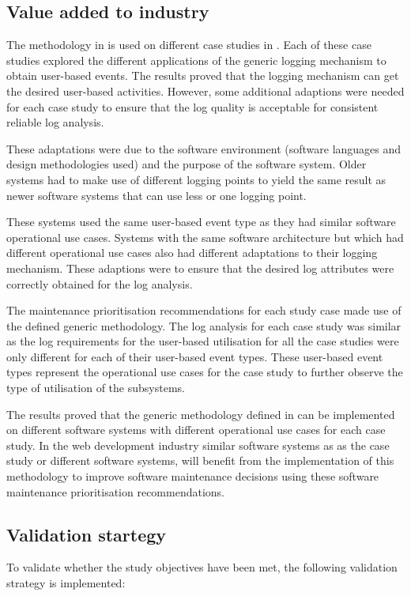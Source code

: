\subsection{Value added to industry}
The methodology in  is used on different case studies in .
Each of these case studies explored the different applications of the generic logging mechanism to
obtain user-based events. The results proved that the logging mechanism can get the desired
user-based activities. However, some additional adaptions were needed for each case study to ensure
that the log quality is acceptable for consistent reliable log analysis.\par These adaptations were
due to the software environment (software languages and design methodologies used) and the purpose
of the software system. Older systems had to make use of different logging points to yield the same
result as newer software systems that can use less or one logging point.\par These systems used the
same user-based event type as they had similar software operational use cases. Systems with the same
software architecture but which had different operational use cases also had different adaptations
to their logging mechanism. These adaptions were to ensure that the desired log attributes were
correctly obtained for the log analysis. \par The maintenance prioritisation recommendations for
each study case made use of the defined generic methodology. The log analysis for each case study
was similar as the log requirements for the user-based utilisation for all the case studies were
only different for each of their user-based event types. These user-based event types represent the
operational use cases for the case study to further observe the type of utilisation of the
subsystems. \par The results proved that the generic methodology defined in  can be
implemented on different software systems with different operational use cases for each case study.
In the web development industry similar software systems as as the case study or different software
systems, will benefit from the implementation of this methodology to improve software maintenance
decisions using these software maintenance prioritisation recommendations.

\subsection{Validation startegy}
To validate whether the study objectives have been met, the following validation strategy is
implemented:

